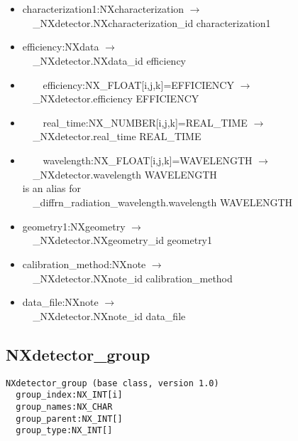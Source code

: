 \documentclass[11pt]{article}
\begin{document}
{{\begin{itemize}
\item{characterization1:NXcharacterization $\rightarrow$\\
\verb|  |\_NXdetector.NXcharacterization\_id characterization1}

\item{efficiency:NXdata $\rightarrow$\\
\verb|  |\_NXdetector.NXdata\_id efficiency}

\item{\verb|    |efficiency:NX\_FLOAT[i,j,k]=EFFICIENCY $\rightarrow$\\
\verb|  |\_NXdetector.efficiency EFFICIENCY}

\item{\verb|    |real\_time:NX\_NUMBER[i,j,k]=REAL\_TIME $\rightarrow$\\
\verb|  |\_NXdetector.real\_time REAL\_TIME}

\item{\verb|    |wavelength:NX\_FLOAT[i,j,k]=WAVELENGTH $\rightarrow$\\
\verb|  |\_NXdetector.wavelength WAVELENGTH \\
is an alias for \\
\verb|  |\_diffrn\_radiation\_wavelength.wavelength WAVELENGTH}

\item{geometry1:NXgeometry $\rightarrow$\\
\verb|  |\_NXdetector.NXgeometry\_id geometry1}

\item{calibration\_method:NXnote $\rightarrow$\\
\verb|  |\_NXdetector.NXnote\_id calibration\_method}

\item{data\_file:NXnote $\rightarrow$\\
\verb|  |\_NXdetector.NXnote\_id data\_file}
\end{itemize}



\subsection{NXdetector\_group}

\begin{verbatim}
NXdetector_group (base class, version 1.0)
  group_index:NX_INT[i]
  group_names:NX_CHAR
  group_parent:NX_INT[]
  group_type:NX_INT[]
\end{verbatim}

\begin{itemize}


\end{itemize}}}
\end{document}
